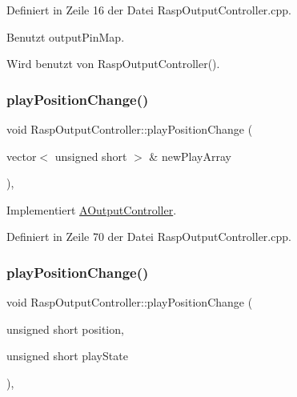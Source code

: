 Definiert in Zeile 16 der Datei Rasp\+Output\+Controller.\+cpp.



Benutzt output\+Pin\+Map.



Wird benutzt von Rasp\+Output\+Controller().

\mbox{\label{class_rasp_output_controller_aa084e570bcf25c75b9389ca63c875f0c}} 
\subsubsection{\texorpdfstring{play\+Position\+Change()}{playPositionChange()}\hspace{0.1cm}{\footnotesize\ttfamily [1/2]}}
{\footnotesize\ttfamily void Rasp\+Output\+Controller\+::play\+Position\+Change (\begin{DoxyParamCaption}\item[{vector$<$ unsigned short $>$ \&}]{new\+Play\+Array }\end{DoxyParamCaption})\hspace{0.3cm}{\ttfamily [override]}, {\ttfamily [virtual]}}



Implementiert \hyperlink{class_a_output_controller_a7bad658dfc3eb1223ace0c0454130818}{A\+Output\+Controller}.



Definiert in Zeile 70 der Datei Rasp\+Output\+Controller.\+cpp.

\mbox{\label{class_rasp_output_controller_a0778395ee8ec044d04fbfcb2f3b2eb04}} 
\subsubsection{\texorpdfstring{play\+Position\+Change()}{playPositionChange()}\hspace{0.1cm}{\footnotesize\ttfamily [2/2]}}
{\footnotesize\ttfamily void Rasp\+Output\+Controller\+::play\+Position\+Change (\begin{DoxyParamCaption}\item[{unsigned short}]{position,  }\item[{unsigned short}]{play\+State }\end{DoxyParamCaption})\hspace{0.3cm}{\ttfamily [override]}, {\ttfamily [virtual]}}



